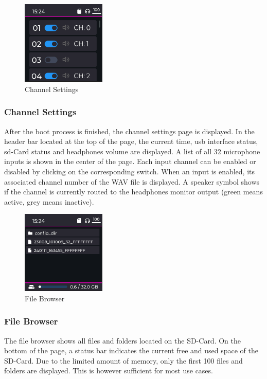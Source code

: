 \begin{minipage}{\linewidth}
	\begin{figure}
		\vspace{-0.6cm}
		\includegraphics[width=4cm]{images/4_design_acquisition_system/gui/03_channel_settings.png}
		\centering
		\caption{Channel Settings}
		\label{fig:acquisition_system_gui_channel_settings}
	\end{figure}
	\subsubsection{Channel Settings}
	After the boot process is finished, the channel settings page is displayed.
	In the header bar located at the top of the page, the current time, \acrshort{usb} interface status, \acrshort{sd}-Card status and headphones volume are displayed.
	A list of all 32 microphone inputs is shown in the center of the page.
	Each input channel can be enabled or disabled by clicking on the corresponding switch.
	When an input is enabled, its associated channel number of the WAV file is displayed.
	A speaker symbol shows if the channel is currently routed to the headphones monitor output (green means active, grey means inactive).
\end{minipage}
\vspace{0.0cm}

\begin{minipage}{\linewidth}
	\begin{figure}
		\vspace{-0.6cm}
		\includegraphics[width=4cm]{images/4_design_acquisition_system/gui/02_file_browser.png}
		\centering
		\caption{File Browser}
		\label{fig:acquisition_system_gui_file_browser}
	\end{figure}
	\subsubsection{File Browser}
	The file browser shows all files and folders located on the SD-Card.
	On the bottom of the page, a status bar indicates the current free and used space of the SD-Card.
	Due to the limited amount of memory, only the first 100 files and folders are displayed.
	This is however sufficient for most use cases.
\end{minipage}
\vspace{1.8cm}

